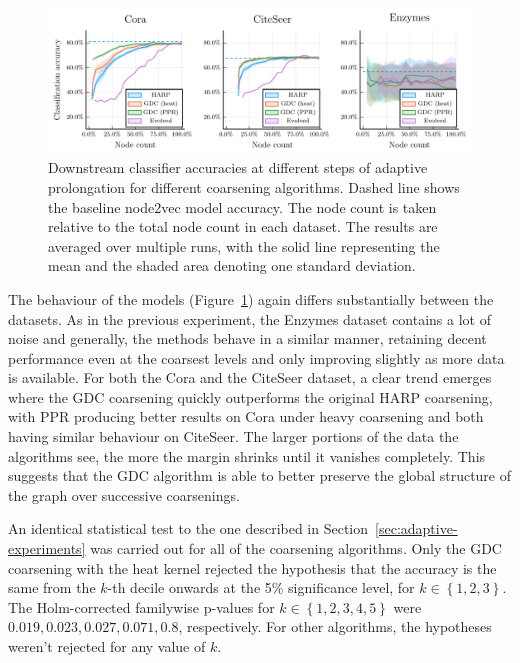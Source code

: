 \begin{figure}
  \centering
  \includegraphics[width=\linewidth]{images/coarsening-algorithms/coarsening-algorithms.pdf}
  \caption{Downstream classifier accuracies at different steps of adaptive prolongation for different coarsening algorithms. Dashed line shows the baseline node2vec model accuracy. The node count is taken relative to the total node count in each dataset. The results are averaged over multiple runs, with the solid line representing the mean and the shaded area denoting one standard deviation.}
  \label{fig:coarsening-algorithms}
\end{figure}

The behaviour of the models (Figure~\ref{fig:coarsening-algorithms}) again differs substantially between the datasets. As in the previous experiment, the Enzymes dataset contains a lot of noise and generally, the methods behave in a similar manner, retaining decent performance even at the coarsest levels and only improving slightly as more data is available. For both the Cora and the CiteSeer dataset, a clear trend emerges where the GDC coarsening quickly outperforms the original HARP coarsening, with PPR producing better results on Cora under heavy coarsening and both having similar behaviour on CiteSeer. The larger portions of the data the algorithms see, the more the margin shrinks until it vanishes completely. This suggests that the GDC algorithm is able to better preserve the global structure of the graph over successive coarsenings.

An identical statistical test to the one described in Section~\ref{sec:adaptive-experiments} was carried out for all of the coarsening algorithms. Only the GDC coarsening with the heat kernel rejected the hypothesis that the accuracy is the same from the \( k \)-th decile onwards at the 5\% significance level, for \( k \in \left\{ 1, 2, 3 \right\} \). The Holm-corrected familywise p-values for \( k \in \left\{ 1, 2, 3, 4, 5 \right\} \) were \( 0.019, 0.023, 0.027, 0.071, 0.8 \), respectively. For other algorithms, the hypotheses weren't rejected for any value of \( k \).
